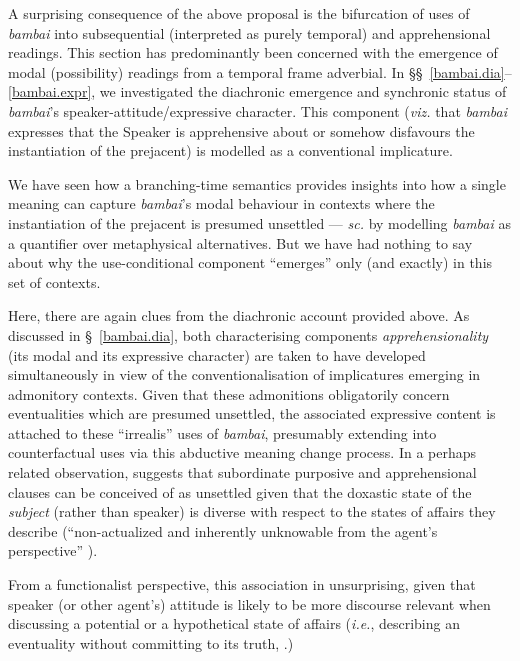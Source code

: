 A surprising consequence of the above proposal is the bifurcation of uses of \textit{bambai} into subsequential (interpreted as purely temporal) and apprehensional readings. This section has predominantly been concerned with the emergence of modal (possibility) readings from a temporal frame adverbial. In \S\S~\ref{bambai.dia}--\ref{bambai.expr}, we investigated the diachronic emergence and synchronic status of \textit{bambai}'s speaker-attitude/expressive character. This component (\textit{viz.} that \textit{bambai} expresses that the Speaker is apprehensive about or somehow disfavours the instantiation of the prejacent) is modelled as a conventional implicature.

We have seen how a branching-time semantics provides insights into how a single meaning can capture \textit{bambai}'s modal behaviour in contexts where the instantiation of the prejacent is presumed unsettled --- \textit{sc.} by modelling \textit{bambai} as a quantifier over metaphysical alternatives. But we have had nothing to say about why the use-conditional component ``emerges'' only (and exactly) in this set of contexts.

Here, there are again clues from the diachronic account provided above. As discussed in \S~\ref{bambai.dia}, both characterising components \textit{apprehensionality} (its modal and its expressive character) are taken to have developed simultaneously in view of the conventionalisation of implicatures emerging in admonitory contexts. Given that these admonitions obligatorily concern eventualities which are presumed unsettled, the associated expressive content is attached to these ``irrealis'' uses of \textit{bambai}, presumably extending into counterfactual uses via this abductive meaning change process. In a perhaps related observation, \citeauthor{Verstraete2006} suggests that subordinate purposive and apprehensional clauses can be conceived of as unsettled given that the doxastic state of the \textit{subject} (rather than speaker) is diverse with respect to the states of affairs they describe (``non-actualized and inherently unknowable from the agent's perspective'' \citeyear[71]{Verstraete2006}).


 From a functionalist perspective, this association in unsurprising, given that speaker (or other agent's) attitude is likely to be more discourse relevant when discussing a potential or a hypothetical state of affairs (\textit{i.e.}, describing an eventuality without committing to its truth, \citealp[see also][74-76]{Verstraete2006}.)

